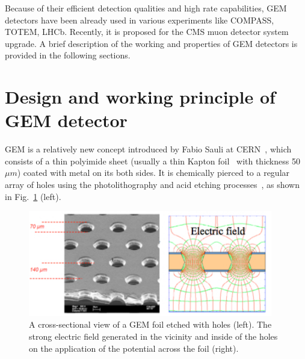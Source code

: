 Because of their efficient detection qualities and high rate capabilities, GEM detectors have been already used in various experiments like COMPASS, TOTEM, LHCb. Recently, it is proposed for the CMS muon detector system upgrade. A brief description of the working and properties of GEM detectors is provided in the following sections.

\section{Design and working principle of GEM detector} %
\label{sec:design_and_working_principle_of_gem}

GEM is a relatively new concept introduced by Fabio Sauli at CERN~\cite{Sauli1997}, which consists of a thin polyimide sheet (usually a thin Kapton foil~\cite{Kapton-sheet} with thickness 50 $\mu m$) coated with metal on its both sides. It is chemically pierced to a regular array of holes using the photolithography and acid etching processes~\cite{Benlloch1998}, as shown in Fig.~\ref{fig:gem} (left).
\begin{figure}[!htbp]
    \centering
    \includegraphics[width=0.95\textwidth]{figures/GEM/KEKDTP3.jpg}
    \caption{A cross-sectional view of a GEM foil etched with holes (left). The strong electric field generated in the vicinity and inside of the holes on the application of the potential across the foil (right).}
    \label{fig:gem}
\end{figure}

